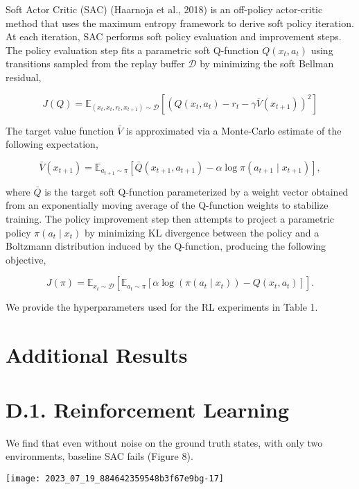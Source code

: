 \documentclass[10pt]{article}
\begin{document}
Soft Actor Critic (SAC) (Haarnoja et al., 2018) is an off-policy actor-critic method that uses the maximum entropy framework to derive soft policy iteration. At each iteration, SAC performs soft policy evaluation and improvement steps. The policy evaluation step fits a parametric soft Q-function $Q\left(x_{t}, a_{t}\right)$ using transitions sampled from the replay buffer $\mathcal{D}$ by minimizing the soft Bellman residual,

\[
J(Q)=\mathbb{E}_{\left(x_{t}, x_{t}, r_{t}, x_{t+1}\right) \sim \mathcal{D}}\left[\left(Q\left(x_{t}, a_{t}\right)-r_{t}-\gamma \bar{V}\left(x_{t+1}\right)\right)^{2}\right]
\]

The target value function $\bar{V}$ is approximated via a Monte-Carlo estimate of the following expectation,

\[
\bar{V}\left(x_{t+1}\right)=\mathbb{E}_{a_{t+1} \sim \pi}\left[\bar{Q}\left(x_{t+1}, a_{t+1}\right)-\alpha \log \pi\left(a_{t+1} \mid x_{t+1}\right)\right],
\]

where $\bar{Q}$ is the target soft Q-function parameterized by a weight vector obtained from an exponentially moving average of the Q-function weights to stabilize training. The policy improvement step then attempts to project a parametric policy $\pi\left(a_{t} \mid x_{t}\right)$ by minimizing KL divergence between the policy and a Boltzmann distribution induced by the Q-function, producing the following objective,

\[
J(\pi)=\mathbb{E}_{x_{t} \sim \mathcal{D}}\left[\mathbb{E}_{a_{t} \sim \pi}\left[\alpha \log \left(\pi\left(a_{t} \mid x_{t}\right)\right)-Q\left(x_{t}, a_{t}\right)\right]\right] .
\]

We provide the hyperparameters used for the RL experiments in Table 1.

\section{Additional Results}
\section{D.1. Reinforcement Learning}
We find that even without noise on the ground truth states, with only two environments, baseline SAC fails (Figure 8).

\begin{center}
\texttt{[image: 2023\_07\_19\_884642359548b3f67e9bg-17]}
\end{center}
\end{document}
